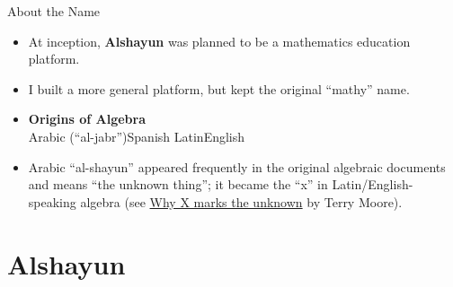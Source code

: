 \documentclass{beamer}
\begin{document}
\begin{frame}{About the Name}
    \begin{itemize}
        \item At inception, \textbf{Alshayun} was planned to be a mathematics
            education platform.
        \item I built a more general platform, but kept the original ``mathy'' name.
        \item
            \begin{center}
                \textbf{Origins of Algebra} \\
                Arabic (``al-jabr'')\textrightarrow Spanish\textrightarrow
                Latin\textrightarrow English
            \end{center}
        \item Arabic ``al-shayun'' appeared frequently in the original algebraic
            documents and means ``the unknown thing''; it became the ``x'' in
            Latin/English-speaking algebra (see
            \href{https://cosmosmagazine.com/mathematics/why-x-marks-unknown-0}{Why
            X marks the unknown} by Terry Moore).
    \end{itemize}
\end{frame}

\section{Alshayun}
\end{document}
